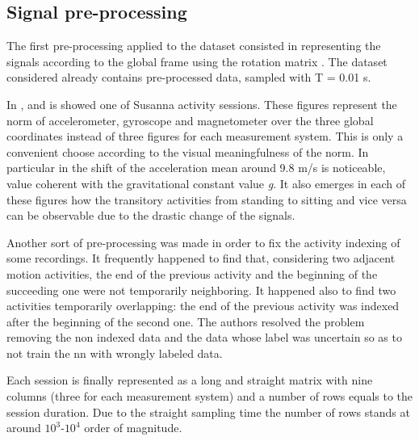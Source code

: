 \subsection{Signal pre-processing}
The first pre-processing applied to the dataset consisted in representing the signals according to the global frame using the rotation matrix . The dataset considered already contains pre-processed data, sampled with T = 0.01 s.

In ,  and  is showed one of Susanna activity sessions. These figures represent the norm of accelerometer, gyroscope and magnetometer over the three global coordinates instead of three figures for each measurement system. This is only a convenient choose according to the visual meaningfulness of the norm. In particular in  the shift of the acceleration mean around 9.8 m/s is noticeable, value coherent with the gravitational constant value \textit{g}. It also emerges in each of these figures how the transitory activities from standing to sitting and vice versa can be observable due to the drastic change of the signals.

Another sort of pre-processing was made in order to fix the activity indexing of some recordings. It frequently happened to find that, considering two adjacent motion activities, the end of the previous activity and the beginning of the succeeding one were not temporarily neighboring. It happened also to find two activities temporarily overlapping: the end of the previous activity was indexed after the beginning of the second one.
The authors resolved the problem removing the non indexed data and the data whose label was uncertain so as to not train the \gls{nn} with wrongly labeled data.

Each session is finally represented as a long and straight matrix with nine columns (three for each measurement system) and a number of rows equals to the session duration. Due to the straight sampling time the number of rows stands at around $10^3$-$10^4$ order of magnitude.


